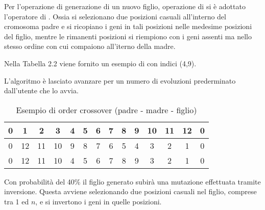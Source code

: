 Per l'operazione di generazione di un nuovo figlio, operazione di  si è adottato l'operatore di . Ossia si selezionano due posizioni casuali all'interno del cromosoma padre e si ricopiano i geni in tali posizioni nelle medesime posizioni del figlio, mentre le rimanenti posizioni si riempiono con i geni assenti ma nello stesso ordine con cui compaiono all'iterno della madre.

Nella Tabella 2.2 viene fornito un esempio di  con indici (4,9).

L'algoritmo è lasciato avanzare per un numero di evoluzioni prederminato dall'utente che lo avvia.

\begin{table}
\centering
\begin{tabular}{|c|c|c|c|c|c|c|c|c|c|c|c|c|c|}
\hline 
0 &  1 &  2 &  3 & 4 & 5 & 6 & 7 & 8 & 9 & 10 & 11 & 12 & 0\\
\hline
0 & 12 & 11 & 10 & 9 & 8 & 7 & 6 & 5 & 4 &  3 &  2 &  1 & 0\\
\hline
0 & 12 & 11 & 10 & 4 & 5 & 6 & 7 & 8 & 9 &  3 &  2 &  1 & 0\\
\hline
\end{tabular}
\caption{Esempio di order crossover (padre - madre - figlio)}
\end{table}

Con probabilità del 40\% il figlio generato subirà una mutazione effettuata tramite inversione. Questa avviene selezionando due posizioni casuali nel figlio, comprese tra 1 ed $n$, e si invertono i geni in quelle posizioni.